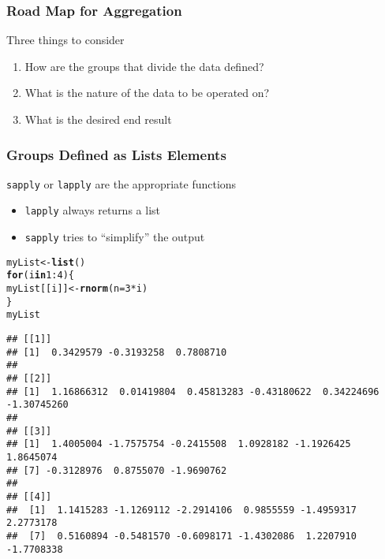 \documentclass[paper=screen,mathserif]{beamer}\usepackage[]{graphicx}\usepackage[]{color}
\makeatletter
\newcommand{\hlnum}[1]{\textcolor[rgb]{0.686,0.059,0.569}{#1}}%
\newcommand{\hlopt}[1]{\textcolor[rgb]{0,0,0}{#1}}%
\newcommand{\hlstd}[1]{\textcolor[rgb]{0.345,0.345,0.345}{#1}}%
\newcommand{\hlkwa}[1]{\textcolor[rgb]{0.161,0.373,0.58}{\textbf{#1}}}%
\newcommand{\hlkwb}[1]{\textcolor[rgb]{0.69,0.353,0.396}{#1}}%
\newcommand{\hlkwc}[1]{\textcolor[rgb]{0.333,0.667,0.333}{#1}}%
\newcommand{\hlkwd}[1]{\textcolor[rgb]{0.737,0.353,0.396}{\textbf{#1}}}%
\newenvironment{kframe}{%
 \def\at@end@of@kframe{}%
 \ifinner\ifhmode%
  \def\at@end@of@kframe{\end{minipage}}%
  \begin{minipage}{\columnwidth}%
 \fi\fi%
 \def\FrameCommand##1{\hskip\@totalleftmargin \hskip-\fboxsep
 \colorbox{shadecolor}{##1}\hskip-\fboxsep
     \hskip-\linewidth \hskip-\@totalleftmargin \hskip\columnwidth}%
 \MakeFramed {\advance\hsize-\width
   \@totalleftmargin\z@ \linewidth\hsize
   \@setminipage}}%
 {\par\unskip\endMakeFramed%
 \at@end@of@kframe}
\newenvironment{knitrout}{}{} %
\newcommand{\ft}[1]{\frametitle{#1}}
\makeatother
\begin{document}
\begin{frame}[fragile]
  \ft{Road Map for Aggregation}
  
  Three things to consider
  \begin{enumerate}
  \item How are the groups that divide the data defined?
  \item What is the nature of the data to be operated on?
  \item What is the desired end result
  \end{enumerate}
  
\end{frame}

\begin{frame}[fragile]
  \ft{Groups Defined as Lists Elements}
  
  \verb=sapply= or \verb=lapply= are the appropriate functions
  \begin{itemize}
  \item \verb=lapply= always returns a list
  \item \verb=sapply= tries to ``simplify'' the output
  \end{itemize}
\pause
\begin{knitrout}\tiny
{}\color{fgcolor}\begin{kframe}
\begin{alltt}
\hlstd{myList} \hlkwb{<-} \hlkwd{list}\hlstd{()}
\hlkwa{for} \hlstd{(i} \hlkwa{in} \hlnum{1}\hlopt{:}\hlnum{4}\hlstd{) \{}
    \hlstd{myList[[i]]} \hlkwb{<-} \hlkwd{rnorm}\hlstd{(}\hlkwc{n} \hlstd{=} \hlnum{3} \hlopt{*} \hlstd{i)}
\hlstd{\}}
\hlstd{myList}
\end{alltt}
\begin{verbatim}
## [[1]]
## [1]  0.3429579 -0.3193258  0.7808710
## 
## [[2]]
## [1]  1.16866312  0.01419804  0.45813283 -0.43180622  0.34224696 -1.30745260
## 
## [[3]]
## [1]  1.4005004 -1.7575754 -0.2415508  1.0928182 -1.1926425  1.8645074
## [7] -0.3128976  0.8755070 -1.9690762
## 
## [[4]]
##  [1]  1.1415283 -1.1269112 -2.2914106  0.9855559 -1.4959317  2.2773178
##  [7]  0.5160894 -0.5481570 -0.6098171 -1.4302086  1.2207910 -1.7708338
\end{verbatim}
\end{kframe}
\end{knitrout}

\end{frame}
\end{document}

